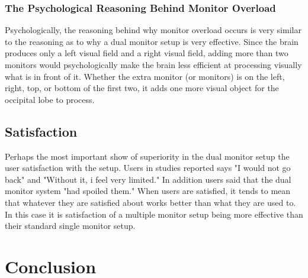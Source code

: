 \documentclass[a4paper]{article}
\begin{document}
\subsubsection{The Psychological Reasoning Behind Monitor Overload}
Psychologically, the reasoning behind why monitor overload occurs is very similar to the reasoning as to why a dual monitor setup is very effective. Since the brain produces only a left visual field and a right visual field, adding more than two monitors would psychologically make the brain less efficient at processing visually what is in front of it. Whether the extra monitor (or monitors) is on the left, right, top, or bottom of the first two, it adds one more visual object for the occipital lobe to process.

\subsection{Satisfaction}
Perhaps the most important show of superiority in the dual monitor setup the user satisfaction with the setup. Users in studies reported says "I would not go back" and "Without it, i feel very limited."\cite{Grudin} In addition users said that the dual monitor system "had spoiled them."\cite{Grudin} When users are satisfied, it tends to mean that whatever they are satisfied about works better than what they are used to. In this case it is satisfaction of a multiple monitor setup being more effective than their standard single monitor setup.

\section{Conclusion}



\end{document}
